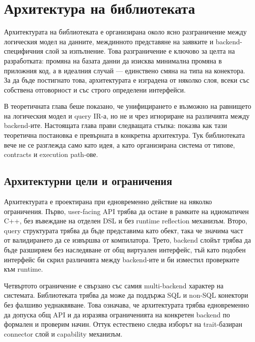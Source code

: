 \section{Архитектура на библиотеката}
\label{sec:architecture}

Архитектурата на библиотеката е организирана около ясно разграничение между логическия модел на данните, междинното представяне на заявките и backend-специфичния слой за изпълнение. Това разграничение е ключово за целта на разработката: промяна на базата данни да изисква минимална промяна в приложния код, а в идеалния случай --- единствено смяна на типа на конектора. За да бъде постигнато това, архитектурата е изградена от няколко слоя, всеки със собствена отговорност и със строго определени интерфейси.

В теоретичната глава беше показано, че унифицирането е възможно на равнището на логическия модел и query IR-а, но не и чрез игнориране на различията между backend-ите. Настоящата глава прави следващата стъпка: показва как тази теоретична постановка е превърната в конкретна архитектура. Тук библиотеката вече не се разглежда само като идея, а като организирана система от типове, contracts и execution path-ове.

\subsection{Архитектурни цели и ограничения}

Архитектурата е проектирана при едновременно действие на няколко ограничения. Първо, user-facing API трябва да остане в рамките на идиоматичен C++, без въвеждане на отделен DSL и без runtime reflection механизъм. Второ, query структурата трябва да бъде представима като  обект, така че значима част от валидирането да се извършва от компилатора. Трето, backend слойът трябва да бъде разширяем без наследяване от общ виртуален интерфейс, тъй като подобен интерфейс би скрил различията между backend-ите и би изместил проверките към runtime.

Четвъртото ограничение е свързано със самия multi-backend характер на системата. Библиотеката трябва да може да поддържа SQL и non-SQL конектори без фалшиво уеднаквяване. Това означава, че архитектурата трябва едновременно да допуска общ API и да изразява ограниченията на конкретен backend по формален и проверим начин. Оттук естествено следва изборът на trait-базиран connector слой и capability механизъм.

